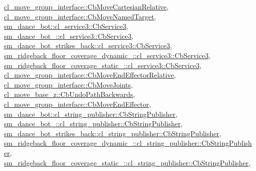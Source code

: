 \hyperlink{classcl__move__group__interface_1_1CbMoveCartesianRelative_a7d65e3d5fa3f2c7b47d9cbe631f448ad}{cl\+\_\+move\+\_\+group\+\_\+interface\+::\+Cb\+Move\+Cartesian\+Relative}, \hyperlink{classcl__move__group__interface_1_1CbMoveNamedTarget_ab212edda280e896977d7ac567e4c1b29}{cl\+\_\+move\+\_\+group\+\_\+interface\+::\+Cb\+Move\+Named\+Target}, \hyperlink{classsm__dance__bot_1_1cl__service3_1_1CbService3_ae9e3796b507ad96cc0890fec0f64a4b7}{sm\+\_\+dance\+\_\+bot\+::cl\+\_\+service3\+::\+Cb\+Service3}, \hyperlink{classsm__dance__bot__2_1_1cl__service3_1_1CbService3_a179e43cc240f53f9c49c67094e41d75f}{sm\+\_\+dance\+\_\+bot\+\_\+::cl\+\_\+service3\+::\+Cb\+Service3}, \hyperlink{classsm__dance__bot__strikes__back_1_1cl__service3_1_1CbService3_a09a2fda38973e1e3915b63a47ca67ed1}{sm\+\_\+dance\+\_\+bot\+\_\+strikes\+\_\+back\+::cl\+\_\+service3\+::\+Cb\+Service3}, \hyperlink{classsm__ridgeback__floor__coverage__dynamic__1_1_1cl__service3_1_1CbService3_a2bea1cd5cff40e33307b0858ea9baf0b}{sm\+\_\+ridgeback\+\_\+floor\+\_\+coverage\+\_\+dynamic\+\_\+::cl\+\_\+service3\+::\+Cb\+Service3}, \hyperlink{classsm__ridgeback__floor__coverage__static__1_1_1cl__service3_1_1CbService3_a0eda2e4af98ebc090234b7f7eacced89}{sm\+\_\+ridgeback\+\_\+floor\+\_\+coverage\+\_\+static\+\_\+::cl\+\_\+service3\+::\+Cb\+Service3}, \hyperlink{classcl__move__group__interface_1_1CbMoveEndEffectorRelative_a805a9d0f85ecdb1f503c1d6349ed9036}{cl\+\_\+move\+\_\+group\+\_\+interface\+::\+Cb\+Move\+End\+Effector\+Relative}, \hyperlink{classcl__move__group__interface_1_1CbMoveJoints_a23e4181af695aed9fa6bb4ae3f17fd76}{cl\+\_\+move\+\_\+group\+\_\+interface\+::\+Cb\+Move\+Joints}, \hyperlink{classcl__move__base__z_1_1CbUndoPathBackwards_a32e680530375b62c7053bf173f6b2b1b}{cl\+\_\+move\+\_\+base\+\_\+z\+::\+Cb\+Undo\+Path\+Backwards}, \hyperlink{classcl__move__group__interface_1_1CbMoveEndEffector_a7e7c22ac6c5725bc95e9852c3f6d939d}{cl\+\_\+move\+\_\+group\+\_\+interface\+::\+Cb\+Move\+End\+Effector}, \hyperlink{classsm__dance__bot_1_1cl__string__publisher_1_1CbStringPublisher_a7aa533578e820ee90d92d15b85d42e9b}{sm\+\_\+dance\+\_\+bot\+::cl\+\_\+string\+\_\+publisher\+::\+Cb\+String\+Publisher}, \hyperlink{classsm__dance__bot__2_1_1cl__string__publisher_1_1CbStringPublisher_abc3c362ea55110f8d340e5cb4d901892}{sm\+\_\+dance\+\_\+bot\+\_\+::cl\+\_\+string\+\_\+publisher\+::\+Cb\+String\+Publisher}, \hyperlink{classsm__dance__bot__strikes__back_1_1cl__string__publisher_1_1CbStringPublisher_a2c3963143fe180a5e5f939362857d2e0}{sm\+\_\+dance\+\_\+bot\+\_\+strikes\+\_\+back\+::cl\+\_\+string\+\_\+publisher\+::\+Cb\+String\+Publisher}, \hyperlink{classsm__ridgeback__floor__coverage__dynamic__1_1_1cl__string__publisher_1_1CbStringPublisher_a50bac09cd616c4ba6be03fadf77612cf}{sm\+\_\+ridgeback\+\_\+floor\+\_\+coverage\+\_\+dynamic\+\_\+::cl\+\_\+string\+\_\+publisher\+::\+Cb\+String\+Publisher}, \hyperlink{classsm__ridgeback__floor__coverage__static__1_1_1cl__string__publisher_1_1CbStringPublisher_a35027bdfa78cbe6becf627f3af3fa91b}{sm\+\_\+ridgeback\+\_\+floor\+\_\+coverage\+\_\+static\+\_\+::cl\+\_\+string\+\_\+publisher\+::\+Cb\+String\+Publisher}, 